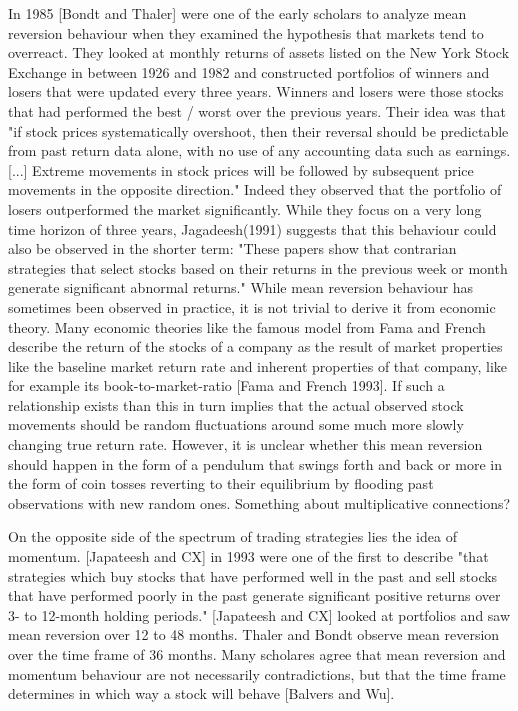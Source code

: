 In 1985 [Bondt and Thaler] were one of the early scholars to analyze mean reversion behaviour when they examined the hypothesis that markets tend to overreact. They looked at monthly returns of assets listed on the New York Stock Exchange in between 1926 and 1982 and constructed portfolios  of winners and losers that were updated every three years. Winners and losers were those stocks that had performed the best / worst over the previous years. Their idea was that "if stock prices systematically overshoot, then their reversal should be predictable from past return data alone, with no use of any accounting data such as earnings. [...] Extreme movements in stock prices will be followed by subsequent price movements in the opposite direction." Indeed they observed that the portfolio of losers outperformed the market significantly. While they focus on a very long time horizon of three years, Jagadeesh(1991) suggests that this behaviour could also be observed in the shorter term:  "These papers show that contrarian strategies that select stocks based on their returns in the previous week or month generate significant abnormal returns." 
While mean reversion behaviour has sometimes been observed in practice, it is not trivial to derive it from economic theory. Many economic theories like the famous model from Fama and French describe the return of the stocks of a company as the result of market properties like the baseline market return rate and inherent properties of that company, like for example its book-to-market-ratio [Fama and French 1993]. If such a relationship exists than this in turn implies that the actual observed stock movements should be random fluctuations around some much more slowly changing true return rate. However, it is unclear whether this mean reversion should happen in the form of a pendulum that swings forth and back or more in the form of coin tosses reverting to their equilibrium by flooding past observations with new random ones. 
Something about multiplicative connections?

On the opposite side of the spectrum of trading strategies lies the idea of momentum. [Japateesh and CX] in 1993 were one of the first to describe "that strategies which buy stocks that have performed well in the past and sell stocks that have performed poorly in the past generate significant positive returns over 3- to 12-month holding periods." [Japateesh and CX] looked at portfolios and saw mean reversion over 12 to 48 months. Thaler and Bondt observe mean reversion over the time frame of 36 months. Many scholares agree that mean reversion and momentum behaviour are not necessarily contradictions, but that the time frame determines in which way a stock will behave [Balvers and Wu]. 


